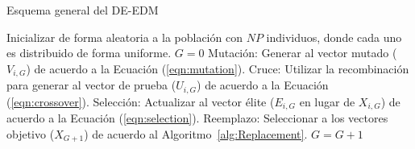 \begin{algorithm}[t]
  \scriptsize
	\caption{Esquema general del DE-EDM} 
	\begin{algorithmic}[1]
	\STATE Inicializar de forma aleatoria a la población con $NP$ individuos, donde cada uno es distribuido de forma uniforme.
	\STATE $G=0$
		\STATE Mutación: Generar al vector mutado ($V_{i,G}$) de acuerdo a la Ecuación (\ref{eqn:mutation}).
		\STATE Cruce: Utilizar la recombinación para generar al vector de prueba ($U_{i,G}$) de acuerdo a la Ecuación (\ref{eqn:crossover}).
		\STATE Selección: Actualizar al vector élite ($E_{i,G}$ en lugar de $X_{i,G}$) de acuerdo a la Ecuación (\ref{eqn:selection}).
	   \ENDFOR
		\STATE Reemplazo: Seleccionar a los vectores objetivo ($X_{G+1}$) de acuerdo al Algoritmo~\ref{alg:Replacement}.
	   \STATE $G=G+1$
	\ENDWHILE
\end{algorithmic}
    \label{alg:DEEDM}
\end{algorithm}



